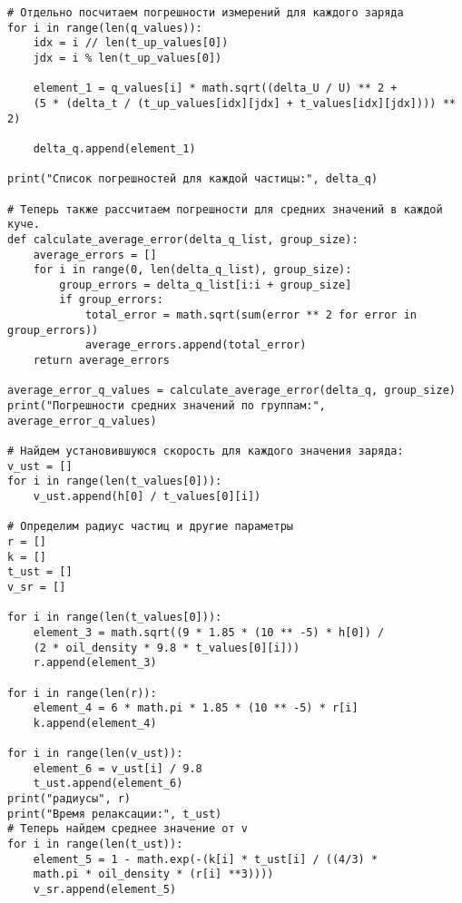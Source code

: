 \documentclass[a4paper,12pt]{article}
\begin{document}
\begin{verbatim}
# Отдельно посчитаем погрешности измерений для каждого заряда
for i in range(len(q_values)):
    idx = i // len(t_up_values[0])
    jdx = i % len(t_up_values[0])
  
    element_1 = q_values[i] * math.sqrt((delta_U / U) ** 2 + 
    (5 * (delta_t / (t_up_values[idx][jdx] + t_values[idx][jdx]))) ** 2)
    
    delta_q.append(element_1)

print("Список погрешностей для каждой частицы:", delta_q)

# Теперь также рассчитаем погрешности для средних значений в каждой куче.
def calculate_average_error(delta_q_list, group_size):
    average_errors = []
    for i in range(0, len(delta_q_list), group_size):
        group_errors = delta_q_list[i:i + group_size]
        if group_errors:
            total_error = math.sqrt(sum(error ** 2 for error in group_errors))
            average_errors.append(total_error)
    return average_errors

average_error_q_values = calculate_average_error(delta_q, group_size)
print("Погрешности средних значений по группам:", average_error_q_values)

# Найдем установившуюся скорость для каждого значения заряда:
v_ust = []
for i in range(len(t_values[0])):  
    v_ust.append(h[0] / t_values[0][i])   

# Определим радиус частиц и другие параметры
r = []
k = []
t_ust = []
v_sr = []

for i in range(len(t_values[0])):
    element_3 = math.sqrt((9 * 1.85 * (10 ** -5) * h[0]) / 
    (2 * oil_density * 9.8 * t_values[0][i]))
    r.append(element_3)

for i in range(len(r)):
    element_4 = 6 * math.pi * 1.85 * (10 ** -5) * r[i]
    k.append(element_4)

for i in range(len(v_ust)):
    element_6 = v_ust[i] / 9.8
    t_ust.append(element_6)
print("радиусы", r)
print("Время релаксации:", t_ust)
# Теперь найдем среднее значение от v
for i in range(len(t_ust)):
    element_5 = 1 - math.exp(-(k[i] * t_ust[i] / ((4/3) * 
    math.pi * oil_density * (r[i] **3))))
    v_sr.append(element_5)


\end{verbatim}
\end{document}
